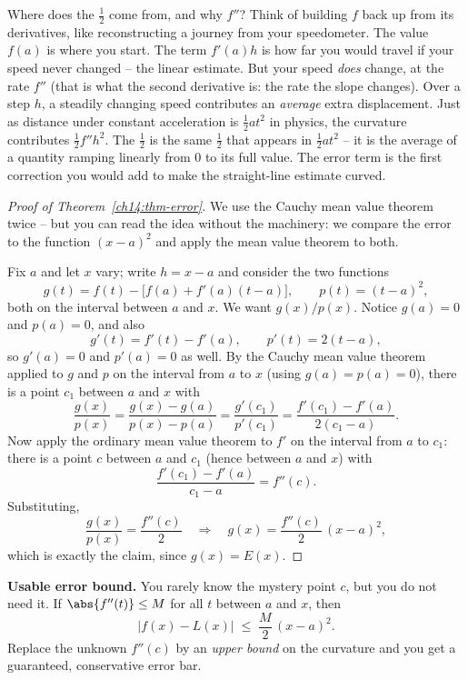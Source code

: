 \begin{whybox}
Where does the $\tfrac12$ come from, and why $f''$? Think of building $f$ back up
from its derivatives, like reconstructing a journey from your speedometer. The
value $f(a)$ is where you start. The term $f'(a)h$ is how far you would travel if
your speed never changed -- the linear estimate. But your speed \emph{does} change,
at the rate $f''$ (that is what the second derivative is: the rate the slope
changes). Over a step $h$, a steadily changing speed contributes an
\emph{average} extra displacement. Just as distance under constant acceleration is
$\tfrac12 a t^2$ in physics, the curvature contributes $\tfrac12 f'' h^2$. The
$\tfrac12$ is the same $\tfrac12$ that appears in $\tfrac12 at^2$ -- it is the
average of a quantity ramping linearly from $0$ to its full value. The error term
is the first correction you would add to make the straight-line estimate curved.
\end{whybox}

\begin{proof}[Proof of Theorem~\ref{ch14:thm-error}]
We use the Cauchy mean value theorem twice -- but you can read the idea without
the machinery: we compare the error to the function $(x-a)^2$ and apply the mean
value theorem to both.

Fix $a$ and let $x$ vary; write $h=x-a$ and consider the two functions
\[
g(t) = f(t) - \big[f(a)+f'(a)(t-a)\big],
\qquad
p(t) = (t-a)^2,
\]
both on the interval between $a$ and $x$. We want $g(x)/p(x)$. Notice
$g(a)=0$ and $p(a)=0$, and also
\[
g'(t) = f'(t) - f'(a), \qquad p'(t) = 2(t-a),
\]
so $g'(a)=0$ and $p'(a)=0$ as well. By the Cauchy mean value theorem applied to
$g$ and $p$ on the interval from $a$ to $x$ (using $g(a)=p(a)=0$), there is a
point $c_1$ between $a$ and $x$ with
\[
\frac{g(x)}{p(x)} = \frac{g(x)-g(a)}{p(x)-p(a)} = \frac{g'(c_1)}{p'(c_1)}
= \frac{f'(c_1)-f'(a)}{2(c_1-a)}.
\]
Now apply the ordinary mean value theorem to $f'$ on the interval from $a$ to
$c_1$: there is a point $c$ between $a$ and $c_1$ (hence between $a$ and $x$) with
\[
\frac{f'(c_1)-f'(a)}{c_1-a} = f''(c).
\]
Substituting,
\[
\frac{g(x)}{p(x)} = \frac{f''(c)}{2}
\quad\Longrightarrow\quad
g(x) = \frac{f''(c)}{2}\,(x-a)^2,
\]
which is exactly the claim, since $g(x)=E(x)$.
\end{proof}

\begin{focusbox}
\textbf{Usable error bound.} You rarely know the mystery point $c$, but you do not
need it. If $\abs{f''(t)}\le M$ for all $t$ between $a$ and $x$, then
\[
\big|f(x)-L(x)\big| \;\le\; \frac{M}{2}\,(x-a)^2.
\]
Replace the unknown $f''(c)$ by an \emph{upper bound} on the curvature and you get
a guaranteed, conservative error bar.
\end{focusbox}

